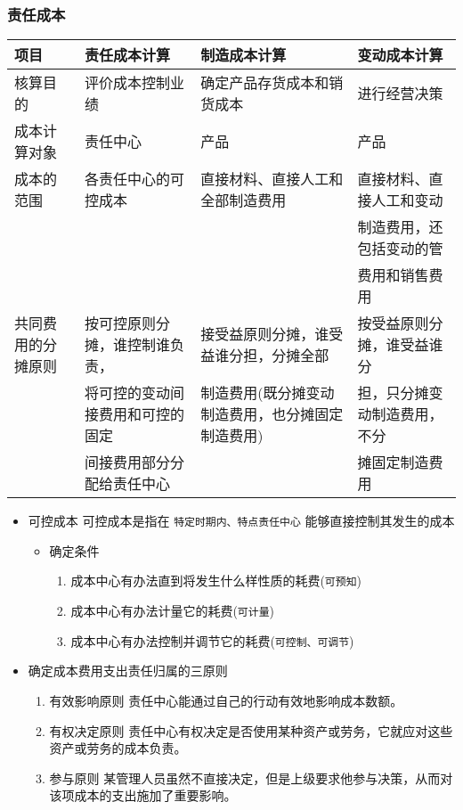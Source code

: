 \documentclass[11pt]{article}
\begin{document}
\subsubsection{责任成本}
\label{sec:org3727e9d}
\begin{center}
\begin{tabular}{llll}
项目 & 责任成本计算 & 制造成本计算 & 变动成本计算\\
\hline
核算目的 & 评价成本控制业绩 & 确定产品存货成本和销货成本 & 进行经营决策\\
\hline
成本计算对象 & 责任中心 & 产品 & 产品\\
\hline
成本的范围 & 各责任中心的可控成本 & 直接材料、直接人工和全部制造费用 & 直接材料、直接人工和变动\\
 &  &  & 制造费用，还包括变动的管\\
 &  &  & 费用和销售费用\\
\hline
共同费用的分摊原则 & 按可控原则分摊，谁控制谁负责， & 接受益原则分摊，谁受益谁分担，分摊全部 & 按受益原则分摊，谁受益谁分\\
 & 将可控的变动间接费用和可控的固定 & 制造费用(既分摊变动制造费用，也分摊固定制造费用) & 担，只分摊变动制造费用，不分\\
 & 间接费用部分分配给责任中心 &  & 摊固定制造费用\\
\end{tabular}
\end{center}
\begin{itemize}
\item 可控成本
可控成本是指在 \texttt{特定时期内、特点责任中心} 能够直接控制其发生的成本
\begin{itemize}
\item 确定条件
\begin{enumerate}
\item 成本中心有办法直到将发生什么样性质的耗费(\texttt{可预知})
\item 成本中心有办法计量它的耗费(\texttt{可计量})
\item 成本中心有办法控制并调节它的耗费(\texttt{可控制、可调节})
\end{enumerate}
\end{itemize}
\item 确定成本费用支出责任归属的三原则
\begin{enumerate}
\item 有效影响原则
责任中心能通过自己的行动有效地影响成本数额。
\item 有权决定原则
责任中心有权决定是否使用某种资产或劳务，它就应对这些资产或劳务的成本负责。
\item 参与原则
某管理人员虽然不直接决定，但是上级要求他参与决策，从而对该项成本的支出施加了重要影响。
\end{enumerate}
\end{itemize}
\end{document}
